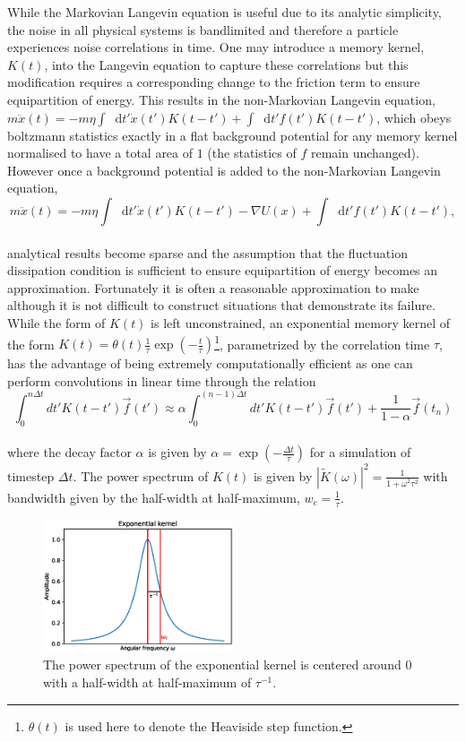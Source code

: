 \documentclass{article}
\newcommand*{\diff}{\mathop{}\!\mathrm{d}}
\begin{document}
While the Markovian Langevin equation is useful due to its analytic simplicity, the noise in all physical systems is bandlimited and therefore a particle experiences noise correlations in time. One may introduce a memory kernel, $K(t)$, into the Langevin equation to capture these correlations but this modification requires a corresponding change to the friction term to ensure equipartition of energy. This results in the non-Markovian Langevin equation, $m\ddot{x}(t)=-m\eta\int\diff{t'}\dot{x}(t')K(t-t') + \int\diff{t'}f(t')K(t-t')$, which obeys boltzmann statistics exactly in a flat background potential for any memory kernel normalised to have a total area of $1$ (the statistics of $f$ remain unchanged). However once a background potential is added to the non-Markovian Langevin equation,
\\
\begin{equation}
	\label{eq:gle}
	m\ddot{x}(t)=-m\eta\int\diff{t'}\dot{x}(t')K(t-t') - \nabla U(x) + \int\diff{t'}f(t')K(t-t'),
\end{equation}
\\
analytical results become sparse and the assumption that the fluctuation dissipation condition is sufficient to ensure equipartition of energy becomes an approximation. Fortunately it is often a reasonable approximation to make although it is not difficult to construct situations that demonstrate its failure. While the form of $K(t)$ is left unconstrained, an exponential memory kernel of the form $K(t)=\theta(t)\frac{1}{\tau}\exp\left(-\frac{t}{\tau}\right)$\footnote{$\theta(t)$ is used here to denote the Heaviside step function.}, parametrized by the correlation time $\tau$, has the advantage of being extremely computationally efficient as one can perform convolutions in linear time through the relation
\\
$$
\int_0^{n\Delta{t}} dt' K\left(t-t'\right) \vec{f}(t') \approx \alpha \int_0^{(n-1)\Delta{t}} dt' K\left(t-t'\right) \vec{f}(t') + \frac{1}{1-\alpha} \vec{f}\left(t_n\right)
$$
\\
where the decay factor $\alpha$ is given by $\alpha=\exp(-\frac{\Delta{t}}{\tau})$ for a simulation of timestep $\Delta{t}$. The power spectrum of $K(t)$ is given by $\left|\tilde{K}(\omega)\right|^2 = \frac{1}{1+\omega^2\tau^2}$ with bandwidth given by the half-width at half-maximum, $w_c=\frac{1}{\tau}$.

\begin{figure}
	\centering
	\includegraphics[width=0.5\textwidth]{kernel_spectra}
	\caption{The power spectrum of the exponential kernel is centered around $0$ with a half-width at half-maximum of $\tau^{-1}$.}
	\label{fig:kernel_spectra}
\end{figure}
\end{document}
